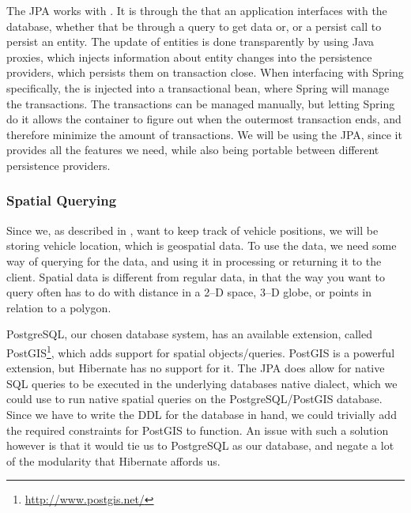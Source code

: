 The \ac{JPA} works with .
It is through the  that an application interfaces with the database, whether that be through a query to get data or, or a persist call to persist an entity.
The update of entities is done transparently by using Java proxies, which injects information about entity changes into the persistence providers, which persists them on transaction close.
When interfacing with Spring specifically, the  is injected into a transactional bean, where Spring will manage the transactions.
The transactions can be managed manually, but letting Spring do it allows the container  to figure out when the outermost transaction ends, and therefore minimize the amount of transactions.
We will be using the \ac{JPA}, since it provides all the features we need, while also being portable between different persistence providers.

\subsubsection{Spatial Querying}
Since we, as described in , want to keep track of vehicle positions, we will be storing vehicle location, which is geospatial data.
To use the data, we need some way of querying for the data, and using it in processing or returning it to the client.
Spatial data is different from regular data, in that the way you want to query often has to do with distance in a 2--D space, 3--D globe, or points in relation to a polygon.

PostgreSQL, our chosen database system, has an available extension, called PostGIS\footnote{\url{http://www.postgis.net/}}, which adds support for spatial objects/queries.
PostGIS is a powerful extension, but Hibernate has no support for it.
The \ac{JPA} does allow for native \ac{SQL} queries to be executed in the underlying databases native dialect, which we could use to run native spatial queries on the PostgreSQL/PostGIS database.
Since we have to write the \ac{DDL} for the database in hand, we could trivially add the required constraints for PostGIS to function.
An issue with such a solution however is that it would tie us to PostgreSQL as our database, and negate a lot of the modularity that Hibernate affords us.


